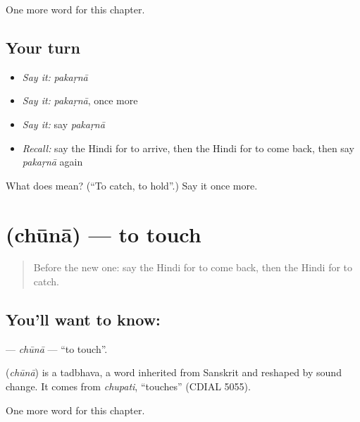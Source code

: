 \begin{grammarlens}[title={What you've built}]
One more word for this chapter.
\end{grammarlens}

\subsection*{Your turn}
\begin{itemize}
\raggedright
  \item \emph{Say it:} \emph{pakaṛnā}
  \item \emph{Say it:} \emph{pakaṛnā}, once more
  \item \emph{Say it:} say \emph{pakaṛnā}
  \item \emph{Recall:} say the Hindi for to arrive, then the Hindi for to come back, then say \emph{pakaṛnā} again
\end{itemize}

\begin{tcolorbox}[breakable,colback=teal!4,colframe=teal!35!black,title={Before you move on}]
What does  mean? (\textquotedblleft{}To catch, to hold\textquotedblright{}.) Say it once more.
\end{tcolorbox}
\section[\texorpdfstring{\hi{छूना} (chūnā)}{छूना (chūnā)}]{ (chūnā) — to touch}

\label{lesson:HI-C165-chuna}



\begin{quote}
Before the new one: say the Hindi for to come back, then the Hindi for to catch.
\end{quote}

\subsection*{You'll want to know: }
\textbf{} — \emph{chūnā} — \textquotedblleft{}to touch\textquotedblright{}.

\begin{cousinweb}
\textbf{} (\emph{chūnā}) is a tadbhava, a word inherited from Sanskrit and reshaped by sound change. It comes from \emph{chupati}, \textquotedblleft{}touches\textquotedblright{} (CDIAL 5055).
\end{cousinweb}

\begin{grammarlens}[title={What you've built}]
One more word for this chapter.
\end{grammarlens}

